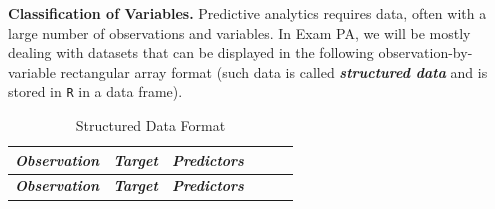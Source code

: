 \documentclass[
  10pt,
]{krantz}
\begin{document}
\textbf{Classification of Variables.} Predictive analytics requires data, often with
a large number of observations and variables. In Exam PA, we will be mostly
dealing with datasets that can be displayed in the following
observation-by-variable rectangular array format (such data is called
\textbf{\emph{structured data}} and is stored in \texttt{R} in a data frame).

\begin{longtable}[]{@{}
  >{\centering\arraybackslash}p{}
  >{\centering\arraybackslash}p{}
  >{\centering\arraybackslash}p{}
  >{\centering\arraybackslash}p{}
  >{\centering\arraybackslash}p{}
  >{\centering\arraybackslash}p{}@{}}
\caption{Structured Data Format}\tabularnewline
\toprule\noalign{}
\begin{minipage}[b]{\linewidth}\centering
\textbf{\emph{Observation}}
\end{minipage} & \begin{minipage}[b]{\linewidth}\centering
\textbf{\emph{Target}}
\end{minipage} & \begin{minipage}[b]{\linewidth}\centering
\textbf{\emph{Predictors}}
\end{minipage} & \begin{minipage}[b]{\linewidth}\centering
\end{minipage} & \begin{minipage}[b]{\linewidth}\centering
\end{minipage} & \begin{minipage}[b]{\linewidth}\centering
\end{minipage} \\
\midrule\noalign{}
\endfirsthead
\toprule\noalign{}
\begin{minipage}[b]{\linewidth}\centering
\textbf{\emph{Observation}}
\end{minipage} & \begin{minipage}[b]{\linewidth}\centering
\textbf{\emph{Target}}
\end{minipage} & \begin{minipage}[b]{\linewidth}\centering
\textbf{\emph{Predictors}}
\end{minipage} & \begin{minipage}[b]{\linewidth}\centering
\end{minipage} & \begin{minipage}[b]{\linewidth}\centering

\end{minipage}
\end{longtable}
\end{document}
